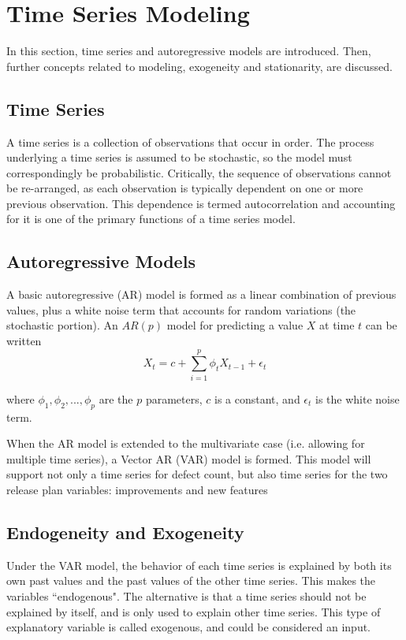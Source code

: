 \documentclass[letterpaper]{report}
\begin{document}
\chapter{Time Series Modeling}
\label{sec:time_series_modeling}
In this section, time series and autoregressive models are introduced. Then, further concepts related to modeling, exogeneity and stationarity, are discussed.

\section*{Time Series}
A time series is a collection of observations that occur in order. The process underlying a time series is assumed to be stochastic, so the model must correspondingly be probabilistic. Critically, the sequence of observations cannot be re-arranged, as each observation is typically dependent on one or more previous observation. This dependence is termed autocorrelation and accounting for it is one of the primary functions of a time series model.

\section*{Autoregressive Models}
A basic autoregressive (AR) model is formed as a linear combination of previous values, plus a white noise term that accounts for random variations (the stochastic portion). An $AR(p)$ model for predicting a value $X$ at time $t$ can be written
\begin{equation}
X_t=c+\sum_{i=1}^{p}{\phi_t X_{t-1}+\epsilon_t}
\end{equation}

where $\phi_1, \phi_2, ..., \phi_p$ are the $p$ parameters, $c$ is a constant, and $\epsilon_t$ is the white noise term.

When the AR model is extended to the multivariate case (i.e. allowing for multiple time series), a Vector AR (VAR) model is formed. This model will support not only a time series for defect count, but also time series for the two release plan variables: improvements and new features

\section*{Endogeneity and Exogeneity}
Under the VAR model, the behavior of each time series is explained by both its own past values and the past values of the other time series. This makes the variables “endogenous".
The alternative is that a time series should not be explained by itself, and is only used to explain other time series. This type of explanatory variable is called exogenous, and could be considered an input.
\end{document}
